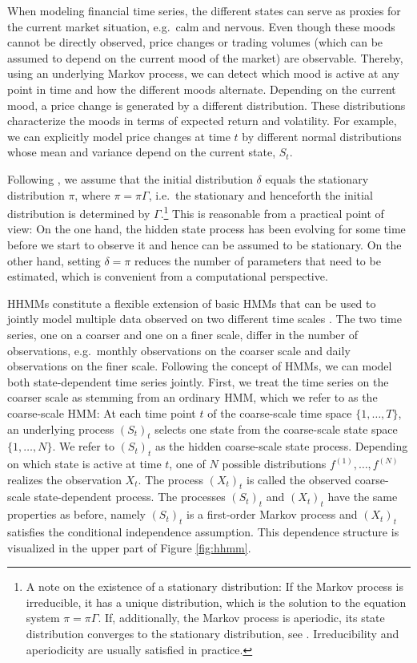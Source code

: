 \documentclass[article]{jss}
\begin{document}
When modeling financial time series, the different states can serve as proxies for the current market situation, e.g.\ calm and nervous. Even though these moods cannot be directly observed, price changes or trading volumes (which can be assumed to depend on the current mood of the market) are observable. Thereby, using an underlying Markov process, we can detect which mood is active at any point in time and how the different moods alternate. Depending on the current mood, a price change is generated by a different distribution. These distributions characterize the moods in terms of expected return and volatility. For example, we can explicitly model price changes at time $t$ by different normal distributions whose mean and variance depend on the current state, $S_t$.

Following \cite{zuc16}, we assume that the initial distribution $\delta$ equals the stationary distribution $\pi$, where $\pi = \pi \Gamma$, i.e.\ the stationary and henceforth the initial distribution is determined by $\Gamma$.\footnote{A note on the existence of a stationary distribution: If the Markov process is irreducible, it has a unique distribution, which is the solution to the equation system $\pi = \pi \Gamma$. If, additionally, the Markov process is aperiodic, its state distribution converges to the stationary distribution, see \cite{nor97}. Irreducibility and aperiodicity are usually satisfied in practice.} This is reasonable from a practical point of view: On the one hand, the hidden state process has been evolving for some time before we start to observe it and hence can be assumed to be stationary. On the other hand, setting $\delta=\pi$ reduces the number of parameters that need to be estimated, which is convenient from a computational perspective.

HHMMs constitute a flexible extension of basic HMMs that can be used to jointly model multiple data observed on two different time scales \citep{oel21}. The two time series, one on a coarser and one on a finer scale, differ in the number of observations, e.g.\ monthly observations on the coarser scale and daily observations on the finer scale. Following the concept of HMMs, we can model both state-dependent time series jointly. First, we treat the time series on the coarser scale as stemming from an ordinary HMM, which we refer to as the coarse-scale HMM: At each time point $t$ of the coarse-scale time space $\{1,\dots,T\}$, an underlying process $(S_t)_t$ selects one state from the coarse-scale state space $\{1,\dots,N\}$. We refer to $(S_t)_t$ as the hidden coarse-scale state process. Depending on which state is active at time $t$, one of $N$ possible distributions $f^{(1)},\dots,f^{(N)}$ realizes the observation $X_t$. The process $(X_t)_t$ is called the observed coarse-scale state-dependent process. The processes $(S_t)_t$ and $(X_t)_t$ have the same properties as before, namely $(S_t)_t$ is a first-order Markov process and $(X_t)_t$ satisfies the conditional independence assumption. This dependence structure is visualized in the upper part of Figure \ref{fig:hhmm}.
\end{document}
